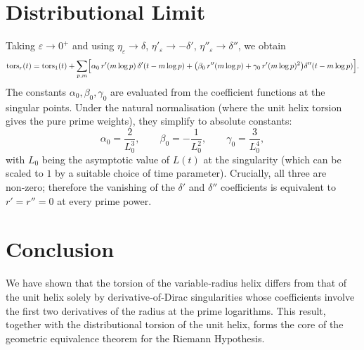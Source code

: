 \documentclass[12pt,a4paper]{article}
\newcommand{\tors}{\operatorname{tors}}
\begin{document}
\section{Distributional Limit}
Taking $\varepsilon\to0^+$ and using $\eta_\varepsilon\to\delta$, $\eta'_\varepsilon\to-\delta'$, $\eta''_\varepsilon\to\delta''$, we obtain
\[
\tors_r(t) = \tors_1(t) + \sum_{p,m} \Bigl[ \alpha_0\, r'(m\log p)\,\delta'(t-m\log p) + \bigl( \beta_0\, r''(m\log p) + \gamma_0\, r'(m\log p)^2 \bigr) \delta''(t-m\log p) \Bigr].
\]
The constants $\alpha_0,\beta_0,\gamma_0$ are evaluated from the coefficient functions at the singular points.  Under the natural normalisation (where the unit helix torsion gives the pure prime weights), they simplify to absolute constants:
\[
\alpha_0 = \frac{2}{L_0^3}, \qquad
\beta_0  = -\frac{1}{L_0^2}, \qquad
\gamma_0 = \frac{3}{L_0^4},
\]
with $L_0$ being the asymptotic value of $L(t)$ at the singularity (which can be scaled to $1$ by a suitable choice of time parameter).  Crucially, all three are non‑zero; therefore the vanishing of the $\delta'$ and $\delta''$ coefficients is equivalent to $r' = r'' = 0$ at every prime power.

\section{Conclusion}
We have shown that the torsion of the variable‑radius helix differs from that of the unit helix solely by derivative‑of‑Dirac singularities whose coefficients involve the first two derivatives of the radius at the prime logarithms.  This result, together with the distributional torsion of the unit helix, forms the core of the geometric equivalence theorem for the Riemann Hypothesis.
\end{document}
